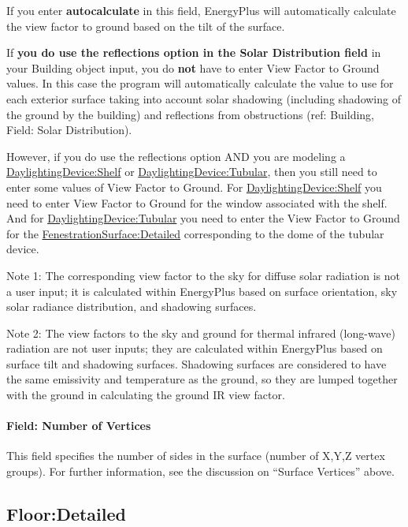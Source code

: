 If you enter \textbf{autocalculate} in this field, EnergyPlus will automatically calculate the view factor to ground based on the tilt of the surface.

If \textbf{you do use the reflections option in the Solar Distribution field} in your Building object input, you do \textbf{not} have to enter View Factor to Ground values. In this case the program will automatically calculate the value to use for each exterior surface taking into account solar shadowing (including shadowing of the ground by the building) and reflections from obstructions (ref: Building, Field: Solar Distribution).

However, if you do use the reflections option AND you are modeling a \hyperref[daylightingdeviceshelf]{DaylightingDevice:Shelf} or \hyperref[daylightingdevicetubular]{DaylightingDevice:Tubular}, then you still need to enter some values of View Factor to Ground. For \hyperref[daylightingdeviceshelf]{DaylightingDevice:Shelf} you need to enter View Factor to Ground for the window associated with the shelf. And for \hyperref[daylightingdevicetubular]{DaylightingDevice:Tubular} you need to enter the View Factor to Ground for the \hyperref[fenestrationsurfacedetailed]{FenestrationSurface:Detailed} corresponding to the dome of the tubular device.

Note 1: The corresponding view factor to the sky for diffuse solar radiation is not a user input; it is calculated within EnergyPlus based on surface orientation, sky solar radiance distribution, and shadowing surfaces.

Note 2: The view factors to the sky and ground for thermal infrared (long-wave) radiation are not user inputs; they are calculated within EnergyPlus based on surface tilt and shadowing surfaces. Shadowing surfaces are considered to have the same emissivity and temperature as the ground, so they are lumped together with the ground in calculating the ground IR view factor.

\paragraph{Field: Number of Vertices}\label{field-number-of-vertices-1}

This field specifies the number of sides in the surface (number of X,Y,Z vertex groups). For further information, see the discussion on ``Surface Vertices'' above.

\subsection{Floor:Detailed}\label{floordetailed}

